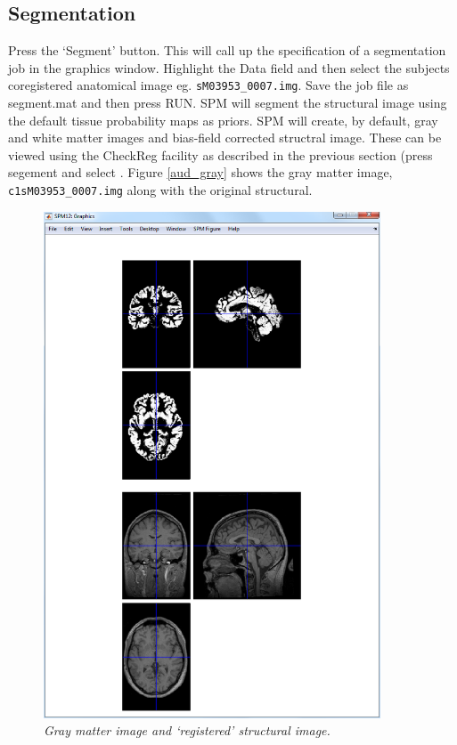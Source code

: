 \documentclass[a4paper,titlepage]{book}
\begin{document}
\subsection{Segmentation}

Press the `Segment' button. This will call up the specification of a segmentation job in the graphics 
window. Highlight the Data field and then select 
the subjects coregistered anatomical image 
eg. \verb!sM03953_0007.img!. Save the job file
as {\sf segment.mat} and then press RUN.
SPM will segment the structural image using 
the default tissue probability maps as 
priors. 
SPM will create, by default, gray and white matter
images and bias-field corrected structral image.
These can be viewed using the CheckReg facility 
as described in the previous section (press segement 
and select . Figure \ref{aud_gray} shows the gray matter image, \verb!c1sM03953_0007.img! along with the original structural.
\begin{figure}
\begin{center}
\includegraphics[width=100mm]{gray}
\caption{\em Gray matter image and `registered' structural image. \label{face_gray}}
\end{center}
\end{figure}
\end{document}

